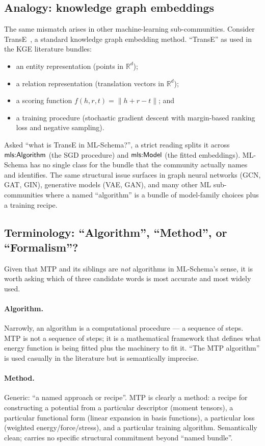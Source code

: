 \subsection{Analogy: knowledge graph embeddings}

The same mismatch arises in other machine-learning sub-communities.
Consider TransE~\cite{bordes2013transe}, a standard knowledge graph
embedding method. ``TransE'' as used in the KGE literature bundles:
%
\begin{itemize}
\item an entity representation (points in $\mathbb{R}^d$);
\item a relation representation (translation vectors in $\mathbb{R}^d$);
\item a scoring function $f(h,r,t) = \|h + r - t\|$; and
\item a training procedure (stochastic gradient descent with
  margin-based ranking loss and negative sampling).
\end{itemize}
%
Asked ``what is TransE in ML-Schema?'', a strict reading splits it
across $\mathsf{mls{:}Algorithm}$ (the SGD procedure) and $\mathsf{mls{:}Model}$ (the fitted
embeddings). ML-Schema has no single class for the bundle that the
community actually names and identifies. The same structural issue
surfaces in graph neural networks (GCN, GAT, GIN), generative models
(VAE, GAN), and many other ML sub-communities where a named
``algorithm'' is a bundle of model-family choices plus a training
recipe.

\subsection{Terminology: ``Algorithm'', ``Method'', or ``Formalism''?}

Given that MTP and its siblings are \emph{not} algorithms in
ML-Schema's sense, it is worth asking which of three candidate words is
most accurate and most widely used.

\paragraph{Algorithm.}
Narrowly, an algorithm is a computational procedure --- a sequence of
steps. MTP is not a sequence of steps; it is a mathematical framework
that defines what energy function is being fitted plus the machinery to
fit it. ``The MTP algorithm'' is used casually in the literature but
is semantically imprecise.

\paragraph{Method.}
Generic: ``a named approach or recipe''. MTP is clearly a method: a
recipe for constructing a potential from a particular descriptor
(moment tensors), a particular functional form (linear expansion in
basis functions), a particular loss (weighted energy/force/stress),
and a particular training algorithm. Semantically clean; carries no
specific structural commitment beyond ``named bundle''.

